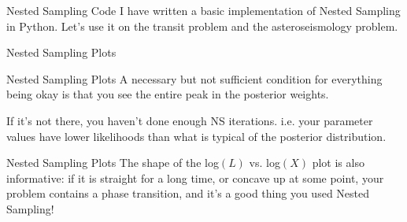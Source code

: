 \documentclass{beamer}
\begin{document}
\begin{frame}[t]{Nested Sampling Code}
I have written a basic implementation of Nested Sampling in Python. Let's
use it on the transit problem and the asteroseismology problem.

\end{frame}

\begin{frame}[t]{Nested Sampling Plots}
\vspace{-10pt}

\end{frame}

\begin{frame}[t]{Nested Sampling Plots}
A necessary but not sufficient condition for everything being okay is that you
see the entire peak in the posterior weights.\\

\vspace{20pt}

If it's not there, you haven't done enough NS iterations. i.e. your parameter
values have lower likelihoods than what is typical of the posterior distribution.
\end{frame}

\begin{frame}[t]{Nested Sampling Plots}
The shape of the log$(L)$ vs. log$(X)$ plot is also informative: if it is
straight for a long time, or concave up at some point, your problem contains
a phase transition, and it's a good thing you used Nested Sampling!
\end{frame}
\end{document}
